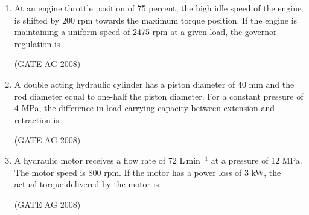 \documentclass[journal,12pt,onecolumn]{IEEEtran}
\begin{document}
\begin{enumerate}
\medskip

\item 
 At an engine throttle position of 75 percent, the high idle speed of the engine is shifted by 200 rpm towards the maximum torque position. If the engine is maintaining a uniform speed of 2475 rpm at a given load, the governor regulation is
\begin{enumerate}
\end{enumerate}
\hfill(GATE AG 2008)\\

\medskip

\item 
 A double acting hydraulic cylinder has a piston diameter of 40 mm and the rod diameter equal to one-half the piston diameter. For a constant pressure of 4 MPa, the difference in load carrying capacity between extension and retraction is
\begin{enumerate}
\end{enumerate}
\hfill(GATE AG 2008)\\

\medskip

\item 
 A hydraulic motor receives a flow rate of 72 L\,min$^{-1}$ at a pressure of 12 MPa. The motor speed is 800 rpm. If the motor has a power loss of 3 kW, the actual torque delivered by the motor is
\begin{enumerate}
\end{enumerate}
\hfill(GATE AG 2008)\\


\end{enumerate}
\end{document}
